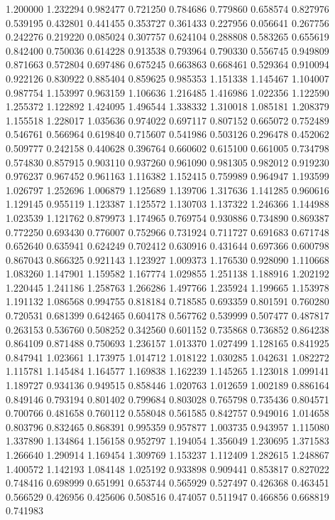 1.200000
1.232294
0.982477
0.721250
0.784686
0.779860
0.658574
0.827976
0.539195
0.432801
0.441455
0.353727
0.361433
0.227956
0.056641
0.267756
0.242276
0.219220
0.085024
0.307757
0.624104
0.288808
0.583265
0.655619
0.842400
0.750036
0.614228
0.913538
0.793964
0.790330
0.556745
0.949809
0.871663
0.572804
0.697486
0.675245
0.663863
0.668461
0.529364
0.910094
0.922126
0.830922
0.885404
0.859625
0.985353
1.151338
1.145467
1.104007
0.987754
1.153997
0.963159
1.106636
1.216485
1.416986
1.022356
1.122590
1.255372
1.122892
1.424095
1.496544
1.338332
1.310018
1.085181
1.208379
1.155518
1.228017
1.035636
0.974022
0.697117
0.807152
0.665072
0.752489
0.546761
0.566964
0.619840
0.715607
0.541986
0.503126
0.296478
0.452062
0.509777
0.242158
0.440628
0.396764
0.660602
0.615100
0.661005
0.734798
0.574830
0.857915
0.903110
0.937260
0.961090
0.981305
0.982012
0.919230
0.976237
0.967452
0.961163
1.116382
1.152415
0.759989
0.964947
1.193599
1.026797
1.252696
1.006879
1.125689
1.139706
1.317636
1.141285
0.960616
1.129145
0.955119
1.123387
1.125572
1.130703
1.137322
1.246366
1.144988
1.023539
1.121762
0.879973
1.174965
0.769754
0.930886
0.734890
0.869387
0.772250
0.693430
0.776007
0.752966
0.731924
0.711727
0.691683
0.671748
0.652640
0.635941
0.624249
0.702412
0.630916
0.431644
0.697366
0.600798
0.867043
0.866325
0.921143
1.123927
1.009373
1.176530
0.928090
1.110668
1.083260
1.147901
1.159582
1.167774
1.029855
1.251138
1.188916
1.202192
1.220445
1.241186
1.258763
1.266286
1.497766
1.235924
1.199665
1.153978
1.191132
1.086568
0.994755
0.818184
0.718585
0.693359
0.801591
0.760280
0.720531
0.681399
0.642465
0.604178
0.567762
0.539999
0.507477
0.487817
0.263153
0.536760
0.508252
0.342560
0.601152
0.735868
0.736852
0.864238
0.864109
0.871488
0.750693
1.236157
1.013370
1.027499
1.128165
0.841925
0.847941
1.023661
1.173975
1.014712
1.018122
1.030285
1.042631
1.082272
1.115781
1.145484
1.164577
1.169838
1.162239
1.145265
1.123018
1.099141
1.189727
0.934136
0.949515
0.858446
1.020763
1.012659
1.002189
0.886164
0.849146
0.793194
0.801402
0.799684
0.803028
0.765798
0.735436
0.804571
0.700766
0.481658
0.760112
0.558048
0.561585
0.842757
0.949016
1.014658
0.803796
0.832465
0.868391
0.995359
0.957877
1.003735
0.943957
1.115080
1.337890
1.134864
1.156158
0.952797
1.194054
1.356049
1.230695
1.371583
1.266640
1.290914
1.169454
1.309769
1.153237
1.112409
1.282615
1.248867
1.400572
1.142193
1.084148
1.025192
0.933898
0.909441
0.853817
0.827022
0.748416
0.698999
0.651991
0.653744
0.565929
0.527497
0.426368
0.463451
0.566529
0.426956
0.425606
0.508516
0.474057
0.511947
0.466856
0.668819
0.741983
